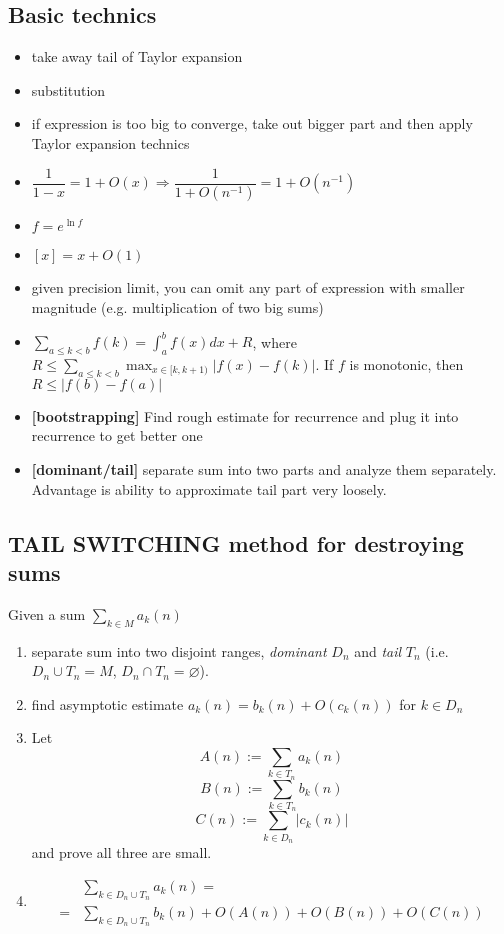 \subsection{Basic technics}
\begin{itemize}
  \item take away tail of Taylor expansion
  \item substitution
  \item if expression is too big to converge, take out bigger part and
  then apply Taylor expansion technics
  \item $\dfrac{1}{1-x} = 1 + O(x) \Longrightarrow \dfrac{1}{1 + O(n^{-1})} = 1 + O(n^{-1})$
  \item $f = e^{\ln f}$
  \item $[x] = x + O(1)$
  \item given precision limit, you can omit any part of expression with smaller magnitude (e.g. multiplication of two big sums)
  \item $\sum_{a \leq k < b} f(k) = \int_{a}^{b} f(x) dx + R$, where $R \leq \sum_{a \leq k < b} \max_{x \in [k, k+1)}{|f(x) - f(k)|}$. 
  If $f$ is monotonic, then $R \leq |f(b) - f(a)|$
  \item \textbf{[bootstrapping]} Find rough estimate for recurrence and plug it into recurrence to get better one
  \item \textbf{[dominant/tail]} separate sum into two parts and analyze them separately. Advantage is ability to 
  approximate tail part very loosely.
\end{itemize}

\subsection{\uppercase{Tail switching} method for destroying sums}
Given a sum $\sum_{k \in M} a_k(n)$
\begin{enumerate}
  \item separate sum into two disjoint ranges, \emph{dominant} $D_n$ and \emph{tail} $T_n$ 
  (i.e. $D_n \cup T_n = M$, $D_n \cap T_n = \varnothing$).
  \item find asymptotic estimate $a_k(n) = b_k(n) + O(c_k(n))$ for $k \in D_n$
  \item Let $$A(n) :=\sum_{k\in T_n} a_k(n)$$ $$B(n) := \sum_{k \in T_n} b_k(n)$$ $$C(n) := \sum_{k \in D_n} |c_k(n)|$$
  and prove all three are small.
  \item \begin{align*} 
  &\sum_{k \in D_n \cup T_n} a_k(n) = \\ 
  =&\sum_{k \in D_n \cup T_n} b_k(n) + O(A(n)) + O(B(n)) + O(C(n))
  \end{align*}
\end{enumerate}

